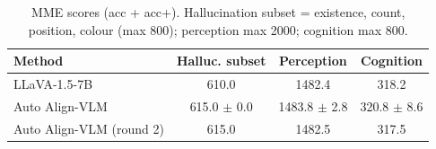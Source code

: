 \begin{table}[t]
\centering
\small
\caption{MME scores (acc + acc+). Hallucination subset = existence, count, position, colour (max 800); perception max 2000; cognition max 800.}
\label{tab:mme}
\begin{tabular}{lccc}
\toprule
Method & Halluc. subset & Perception & Cognition \\
\midrule
LLaVA-1.5-7B & 610.0 & 1482.4 & 318.2 \\
Auto Align-VLM & 615.0 $\pm$ 0.0 & 1483.8 $\pm$ 2.8 & 320.8 $\pm$ 8.6 \\
Auto Align-VLM (round 2) & 615.0 & 1482.5 & 317.5 \\
\bottomrule
\end{tabular}
\end{table}

